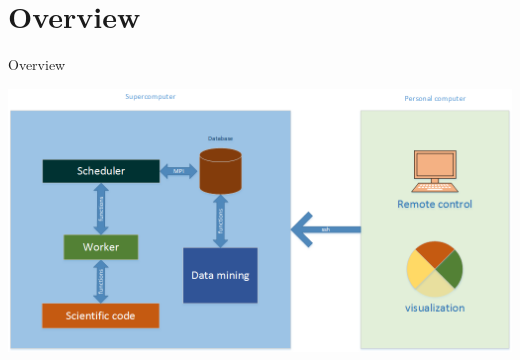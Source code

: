 \section{Overview}
\begin{frame}{Overview}

\centerline{\includegraphics[scale=0.43]{images/overview}}
\end{frame}